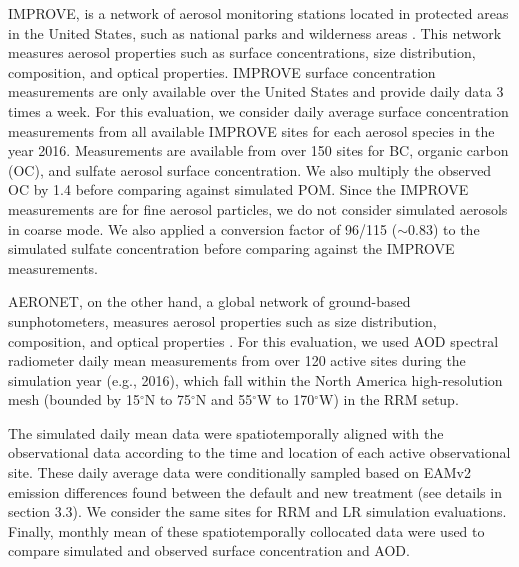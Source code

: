 IMPROVE, is a network of aerosol monitoring stations located in protected areas in the United States, such as national parks and wilderness areas \citep{malm2004spatial}. This network measures aerosol properties such as surface concentrations, size distribution, composition, and optical properties. IMPROVE surface concentration measurements are only available over the United States and provide daily data 3 times a week. For this evaluation, we consider daily average surface concentration measurements from all available IMPROVE sites for each aerosol species in the year 2016. Measurements are available from over 150 sites for BC, organic carbon (OC), and sulfate aerosol surface concentration. We also multiply the observed OC by 1.4 before comparing against simulated POM. Since the IMPROVE measurements are for fine aerosol particles, we do not consider simulated aerosols in coarse mode. We also applied a conversion factor of 96/115 ($\sim$0.83) to the simulated sulfate concentration before comparing against the IMPROVE measurements.

AERONET, on the other hand, a global network of ground-based sunphotometers, measures aerosol properties such as size distribution, composition, and optical properties \citep{holben1998aeronet}. For this evaluation, we used AOD spectral radiometer daily mean measurements from over 120 active sites during the simulation year (e.g., 2016), which fall within the North America high-resolution mesh (bounded by 15$^{\circ}$N to 75$^{\circ}$N and 55$^{\circ}$W to 170$^{\circ}$W) in the RRM setup. 

The simulated daily mean data were spatiotemporally aligned with the observational data according to the time and location of each active observational site. These daily average data were conditionally sampled based on EAMv2 emission differences found between the default and new treatment (see details in section 3.3). We consider the same sites for RRM and LR simulation evaluations. Finally, monthly mean of these spatiotemporally collocated data were used to compare simulated and observed surface concentration and AOD.




